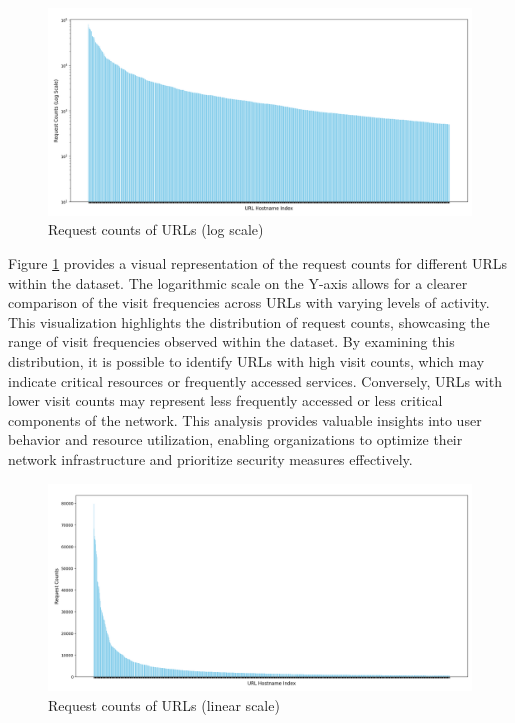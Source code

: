 \begin{figure}
    \centering
    \includegraphics[width=\textwidth]{../Thesis_Docs/media/urls_request_count_log_scale.png}
    \caption{Request counts of URLs (log scale) }
    \label{fig:requestcount}
\end{figure}

Figure \ref{fig:requestcount} provides a visual representation of the request counts for different URLs within the dataset. The logarithmic scale on the Y-axis allows for a clearer comparison of the visit frequencies across URLs with varying levels of activity. This visualization highlights the distribution of request counts, showcasing the range of visit frequencies observed within the dataset. By examining this distribution, it is possible to identify URLs with high visit counts, which may indicate critical resources or frequently accessed services. Conversely, URLs with lower visit counts may represent less frequently accessed or less critical components of the network. This analysis provides valuable insights into user behavior and resource utilization, enabling organizations to optimize their network infrastructure and prioritize security measures effectively. 

\begin{figure}
    \centering
    \includegraphics[width=\textwidth]{../Thesis_Docs/media/urls_request_count_linear_scale.png}
    \caption{Request counts of URLs (linear scale) }
    \label{fig:requestcountlinear}
\end{figure}


